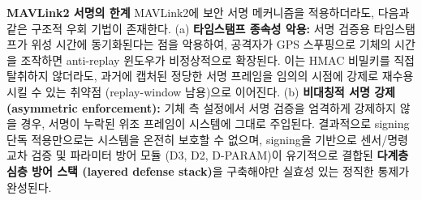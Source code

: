 
\textbf{MAVLink2 서명의 한계} 
MAVLink2에 보안 서명 메커니즘을 적용하더라도, 다음과 같은 구조적 우회 기법이 존재한다. 
(a) \textbf{타임스탬프 종속성 악용:} 서명 검증용 타임스탬프가 위성 시간에 동기화된다는 점을 악용하여, 공격자가 GPS 스푸핑으로 기체의 시간을 조작하면 anti-replay 윈도우가 비정상적으로 확장된다. 이는 HMAC 비밀키를 직접 탈취하지 않더라도, 과거에 캡처된 정당한 서명 프레임을 임의의 시점에 강제로 재수용시킬 수 있는 취약점 (replay-window 남용)으로 이어진다. 
(b) \textbf{비대칭적 서명 강제 (asymmetric enforcement):} 기체 측 설정에서 서명 검증을 엄격하게 강제하지 않을 경우, 서명이 누락된 위조 프레임이 시스템에 그대로 주입된다. 
결과적으로 signing 단독 적용만으로는 시스템을 온전히 보호할 수 없으며, signing을 기반으로 센서/명령 교차 검증 및 파라미터 방어 모듈 (D3, D2, D-PARAM)이 유기적으로 결합된 \textbf{다계층 심층 방어 스택 (layered defense stack)}을 구축해야만 실효성 있는 정직한 통제가 완성된다.

